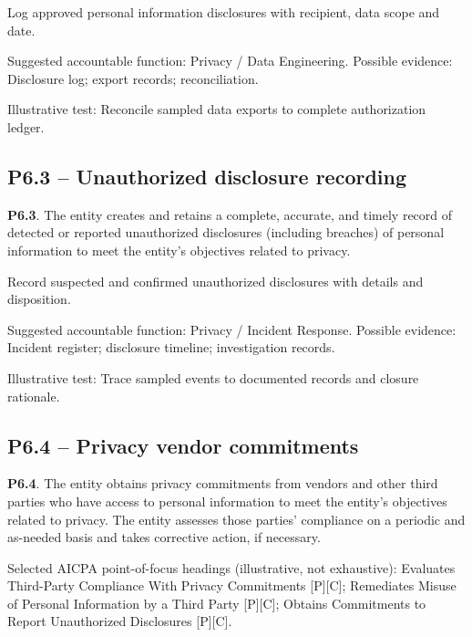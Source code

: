 \documentclass[10pt,oneside]{report}
\begin{document}
\begin{engineeringbox}
Log approved personal information disclosures with recipient, data scope and date.
\end{engineeringbox}
Suggested accountable function: Privacy / Data Engineering. Possible evidence: Disclosure log; export records; reconciliation.

Illustrative test: Reconcile sampled data exports to complete authorization ledger.

\subsection*{P6.3 -- Unauthorized disclosure recording}
\begin{aicpabox}
\textbf{P6.3}. The entity creates and retains a complete, accurate, and timely record of detected or reported unauthorized disclosures (including breaches) of personal information to meet the entity's objectives related to privacy.\par{}
\end{aicpabox}
\begin{engineeringbox}
Record suspected and confirmed unauthorized disclosures with details and disposition.
\end{engineeringbox}
Suggested accountable function: Privacy / Incident Response. Possible evidence: Incident register; disclosure timeline; investigation records.

Illustrative test: Trace sampled events to documented records and closure rationale.

\subsection*{P6.4 -- Privacy vendor commitments}
\begin{aicpabox}
\textbf{P6.4}. The entity obtains privacy commitments from vendors and other third parties who have access to personal information to meet the entity's objectives related to privacy. The entity assesses those parties' compliance on a periodic and as-needed basis and takes corrective action, if necessary.\par{}
\end{aicpabox}
Selected AICPA point-of-focus headings (illustrative, not exhaustive): Evaluates Third-Party Compliance With Privacy Commitments [P][C]; Remediates Misuse of Personal Information by a Third Party [P][C]; Obtains Commitments to Report Unauthorized Disclosures [P][C].
\end{document}
